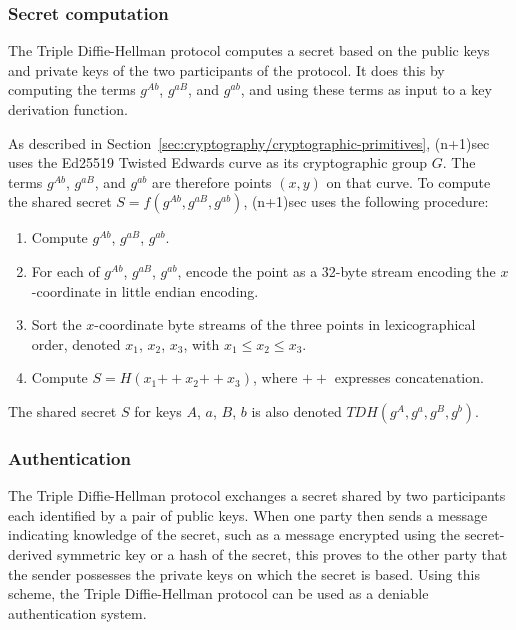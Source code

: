 \documentclass{article}
\def\concat{\mathbin{+\!\!\!+}}
\begin{document}
\subsubsection{Secret computation}
\label{sec:cryptography/triple-diffie-hellman/secret-computation}

The Triple Diffie-Hellman protocol computes a secret based on the public keys and private keys of the two participants of the protocol.
It does this by computing the terms $g^{Ab}$, $g^{aB}$, and $g^{ab}$, and using these terms as input to a key derivation function.

As described in Section~\ref{sec:cryptography/cryptographic-primitives}, (n+1)sec uses the Ed25519 Twisted Edwards curve \cite{ed25519} as its cryptographic group $G$.
The terms $g^{Ab}$, $g^{aB}$, and $g^{ab}$ are therefore points $(x, y)$ on that curve.
To compute the shared secret $S = f(g^{Ab}, g^{aB}, g^{ab})$, (n+1)sec uses the following procedure:
\begin{enumerate}
\item Compute $g^{Ab}$, $g^{aB}$, $g^{ab}$.
\item For each of $g^{Ab}$, $g^{aB}$, $g^{ab}$, encode the point as a 32-byte stream encoding the $x$-coordinate in little endian encoding.
\item Sort the $x$-coordinate byte streams of the three points in lexicographical order, denoted $x_1$, $x_2$, $x_3$, with $x_1 \leq x_2 \leq x_3$.
\item Compute $S = H(x_1 \concat x_2 \concat x_3)$, where $\concat$ expresses concatenation.
\end{enumerate}
The shared secret $S$ for keys $A$, $a$, $B$, $b$ is also denoted $TDH(g^A, g^a, g^B, g^b)$.



\subsubsection{Authentication}
\label{sec:cryptography/triple-diffie-hellman/authentication}

The Triple Diffie-Hellman protocol exchanges a secret shared by two participants each identified by a pair of public keys.
When one party then sends a message indicating knowledge of the secret, such as a message encrypted using the secret-derived symmetric key or a hash of the secret, this proves to the other party that the sender possesses the private keys on which the secret is based.
Using this scheme, the Triple Diffie-Hellman protocol can be used as a deniable authentication system.
\end{document}
